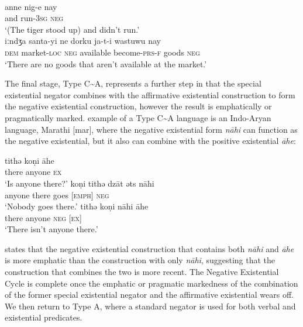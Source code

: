 \documentclass[output=paper]{langsci/langscibook}
\begin{document}
\begin{exe}\ex\begin{xlist}
\ex\label{ex:ieur-kupia-tiger}
\\
    \gll anne nig-e          nay \\
            and   run-\textsc{3sg}      \textsc{neg} \\
    \glt `(The tiger stood up) and didn't run.'
\ex\label{ex:ieur-kupia-market}
\\
\gll iːndʒa santa-yi ne dorku ja-t-i wastuwu nay\\
    \textsc{dem}     market-\textsc{loc} \textsc{neg} available
    become-\textsc{prs-f}
goods      \textsc{neg}\\
\glt `There are no goods that aren't available at the market.'
\end{xlist}\end{exe}
%
The final stage, Type C{\textasciitilde}A, represents a further step in
that the special existential negator combines with the affirmative
existential construction to form the negative existential construction,
however the result is emphatically or pragmatically marked.
 example of a Type C{\textasciitilde}A language is an
Indo-Aryan language, Marathi [mar], where the negative existential form
\textit{nāhi} can function as the negative existential, but it also can
combine with the positive existential \textit{āhe}:
%
\begin{exe}\ex\label{ex:ieur-marathi-anyone}
\begin{xlist}
\ex
    \gll tithǝ  koṇi      āhe \\
there anyone \textsc{ex} \\
    \glt `Is anyone there?'
\ex
\gll koṇi      tithǝ  dzāt {\ob}ǝts{\cb}     nāhi\\
anyone there goes [\textsc{emph}] \textsc{neg}\\
\glt `Nobody goes there.'
\ex
\gll tithǝ  koṇi      nāhi {\ob}āhe{\cb}\\
there anyone \textsc{neg}  [\textsc{ex}]\\
\glt `There isn't anyone there.'
\end{xlist}\end{exe}
%
\citet[12]{Croft1991} states that the negative existential construction
that contains both \textit{nāhi} and \textit{āhe} is more emphatic than the
construction with only \textit{nāhi}, suggesting that the construction that
combines the two is more recent. The Negative Existential Cycle is complete
once the emphatic or pragmatic markedness of the combination of the former
special existential negator and the affirmative existential wears off. We
then return to Type A, where a standard negator is used for both verbal and
existential predicates. 
\end{document}
